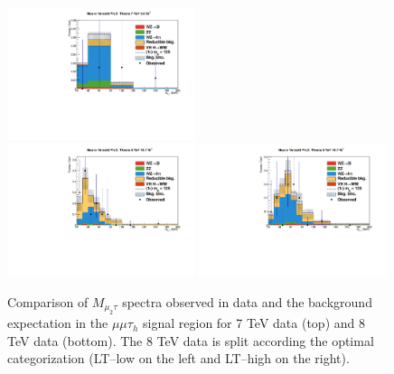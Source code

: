 \begin{figure}
\begin{center}
  \includegraphics[width=0.49\textwidth]{4_Analisys/pics/7TeV/plots/mmt/LTCut/final-subMass-LTCut.pdf}\\
  \includegraphics[width=0.49\textwidth]{4_Analisys/pics/8TeV/plots/mmt/LTLow/final-subMass-LTLow.pdf}
  \includegraphics[width=0.49\textwidth]{4_Analisys/pics/8TeV/plots/mmt/LTHigh/final-subMass-LTHigh.pdf}\\
  \caption{
  Comparison of $M_{\mu_2\tau}$ spectra observed in data and the background expectation %
  in the $\mu\mu\tau_h$ signal region for 7 TeV data (top) and 8 TeV data (bottom). The 8 TeV data is split according the optimal categorization (LT--low on the left and LT--high on the right).
  }
  \label{fig:LLT_mmt_prefit}
\end{center}
\end{figure}

